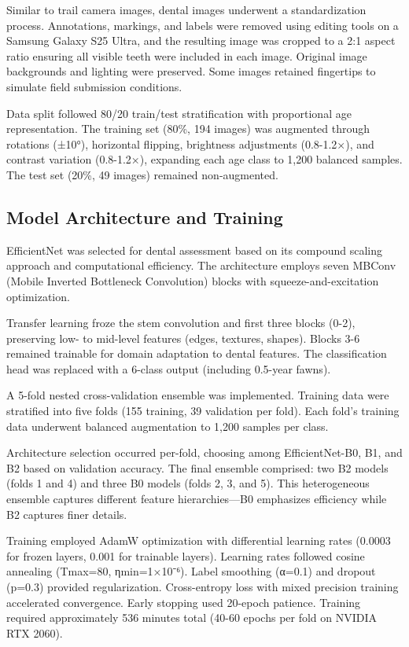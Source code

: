 \documentclass{iopjournal}
\begin{document}
Similar to trail camera images, dental images underwent a standardization process. Annotations, markings, and labels were removed using editing tools on a Samsung Galaxy S25 Ultra, and the resulting image was cropped to a 2:1 aspect ratio ensuring all visible teeth were included in each image. Original image backgrounds and lighting were preserved. Some images retained fingertips to simulate field submission conditions.


Data split followed 80/20 train/test stratification with proportional age representation. The training set (80\%, 194 images) was augmented through rotations (±10°), horizontal flipping, brightness adjustments (0.8-1.2×), and contrast variation (0.8-1.2×), expanding each age class to 1,200 balanced samples. The test set (20\%, 49 images) remained non-augmented.

\subsection{Model Architecture and Training}

EfficientNet \cite{tan2019efficientnet} was selected for dental assessment based on its compound scaling approach and computational efficiency. The architecture employs seven MBConv (Mobile Inverted Bottleneck Convolution) blocks with squeeze-and-excitation optimization.

Transfer learning froze the stem convolution and first three blocks (0-2), preserving low- to mid-level features (edges, textures, shapes). Blocks 3-6 remained trainable for domain adaptation to dental features. The classification head was replaced with a 6-class output (including 0.5-year fawns).

A 5-fold nested cross-validation ensemble was implemented. Training data were stratified into five folds (155 training, 39 validation per fold). Each fold's training data underwent balanced augmentation to 1,200 samples per class.

Architecture selection occurred per-fold, choosing among EfficientNet-B0, B1, and B2 based on validation accuracy. The final ensemble comprised: two B2 models (folds 1 and 4) and three B0 models (folds 2, 3, and 5). This heterogeneous ensemble captures different feature hierarchies—B0 emphasizes efficiency while B2 captures finer details.

Training employed AdamW optimization with differential learning rates (0.0003 for frozen layers, 0.001 for trainable layers). Learning rates followed cosine annealing (Tmax=80, ηmin=1×10⁻⁶). Label smoothing (α=0.1) and dropout (p=0.3) provided regularization. Cross-entropy loss with mixed precision training accelerated convergence. Early stopping used 20-epoch patience. Training required approximately 536 minutes total (40-60 epochs per fold on NVIDIA RTX 2060).
\end{document}
